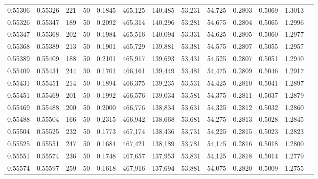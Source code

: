 \begin{tabular}{rrrrrrrrrrrrr}
0.55306 & 0.55326 &   221 &  50 &                                     0.1845 & 465,125 & 140,485 &  53,231 &  54,725 & 0.2803 & 0.5069 & 1.3013 \\
0.55326 & 0.55347 &   189 &  50 &                                     0.2092 & 465,314 & 140,296 &  53,281 &  54,675 & 0.2804 & 0.5065 & 1.2996 \\
0.55347 & 0.55368 &   202 &  50 &                                     0.1984 & 465,516 & 140,094 &  53,331 &  54,625 & 0.2805 & 0.5060 & 1.2977 \\
0.55368 & 0.55389 &   213 &  50 &                                     0.1901 & 465,729 & 139,881 &  53,381 &  54,575 & 0.2807 & 0.5055 & 1.2957 \\
0.55389 & 0.55409 &   188 &  50 &                                     0.2101 & 465,917 & 139,693 &  53,431 &  54,525 & 0.2807 & 0.5051 & 1.2940 \\
0.55409 & 0.55431 &   244 &  50 &                                     0.1701 & 466,161 & 139,449 &  53,481 &  54,475 & 0.2809 & 0.5046 & 1.2917 \\
0.55431 & 0.55451 &   214 &  50 &                                     0.1894 & 466,375 & 139,235 &  53,531 &  54,425 & 0.2810 & 0.5041 & 1.2897 \\
0.55451 & 0.55469 &   201 &  50 &                                     0.1992 & 466,576 & 139,034 &  53,581 &  54,375 & 0.2811 & 0.5037 & 1.2879 \\
0.55469 & 0.55488 &   200 &  50 &                                     0.2000 & 466,776 & 138,834 &  53,631 &  54,325 & 0.2812 & 0.5032 & 1.2860 \\
0.55488 & 0.55504 &   166 &  50 &                                     0.2315 & 466,942 & 138,668 &  53,681 &  54,275 & 0.2813 & 0.5028 & 1.2845 \\
0.55504 & 0.55525 &   232 &  50 &                                     0.1773 & 467,174 & 138,436 &  53,731 &  54,225 & 0.2815 & 0.5023 & 1.2823 \\
0.55525 & 0.55551 &   247 &  50 &                                     0.1684 & 467,421 & 138,189 &  53,781 &  54,175 & 0.2816 & 0.5018 & 1.2800 \\
0.55551 & 0.55574 &   236 &  50 &                                     0.1748 & 467,657 & 137,953 &  53,831 &  54,125 & 0.2818 & 0.5014 & 1.2779 \\
0.55574 & 0.55597 &   259 &  50 &                                     0.1618 & 467,916 & 137,694 &  53,881 &  54,075 & 0.2820 & 0.5009 & 1.2755 \\

\end{tabular}
